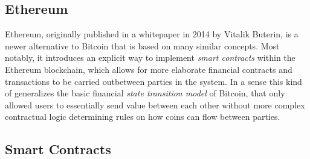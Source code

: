 \documentclass[10pt,a4paper]{article}
\begin{document}
\subsection{Ethereum}

Ethereum, originally published in a whitepaper \cite{Buterin2013} in 2014 by Vitalik Buterin, is a newer alternative to Bitcoin that is based on many similar concepts. Most notably, it introduces an explicit way to implement \textit{smart contracts} within the Ethereum blockchain, which allows for more elaborate financial contracts and transactions to be carried outbetween parties in the system. In a sense this kind of generalizes the basic financial \textit{state transition model} of Bitcoin, that only allowed users to essentially send value between each other without more complex contractual logic determining rules on how coins can flow between parties.

\subsection*{Smart Contracts}





\end{document}
